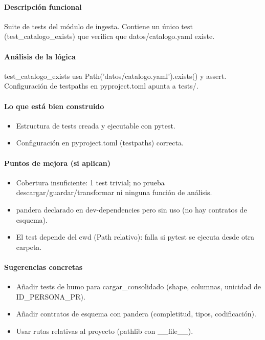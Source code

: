 \paragraph{Descripción funcional}
Suite de tests del módulo de ingesta. Contiene un único test (test\_catalogo\_exists) que verifica que datos/catalogo.yaml existe.

\paragraph{Análisis de la lógica}
test\_catalogo\_exists usa Path('datos/catalogo.yaml').exists() y assert. Configuración de testpaths en pyproject.toml apunta a tests/.

\paragraph{Lo que está bien construido}
\begin{itemize}
  \item Estructura de tests creada y ejecutable con pytest.
  \item Configuración en pyproject.toml (testpaths) correcta.
\end{itemize}

\paragraph{Puntos de mejora (si aplican)}
\begin{itemize}
  \item Cobertura insuficiente: 1 test trivial; no prueba descargar/guardar/transformar ni ninguna función de análisis.
  \item pandera declarado en dev-dependencies pero sin uso (no hay contratos de esquema).
  \item El test depende del cwd (Path relativo): falla si pytest se ejecuta desde otra carpeta.
\end{itemize}

\paragraph{Sugerencias concretas}
\begin{itemize}
  \item Añadir tests de humo para cargar\_consolidado (shape, columnas, unicidad de ID\_PERSONA\_PR).
  \item Añadir contratos de esquema con pandera (completitud, tipos, codificación).
  \item Usar rutas relativas al proyecto (pathlib con \_\_file\_\_).
\end{itemize}

